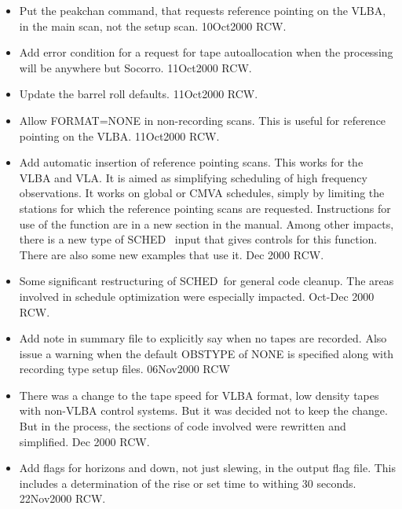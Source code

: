 \documentclass{report}
\newcommand{\schedb}{{\sc SCHED~}}
\begin{document}
\begin{itemize}
\item Put the peakchan command, that requests reference pointing on
      the VLBA, in the main scan, not the setup scan.  10Oct2000 RCW.

\item Add error condition for a request for tape autoallocation
      when the processing will be anywhere but Socorro.  11Oct2000 RCW.

\item Update the barrel roll defaults.  11Oct2000 RCW.

\item Allow FORMAT=NONE in non-recording scans.  This is useful for
      reference pointing on the VLBA.  11Oct2000 RCW.

\item Add automatic insertion of reference pointing scans.  This
      works for the VLBA and VLA.  It is aimed
      as simplifying scheduling of high frequency observations.  It
      works on global or CMVA schedules, simply by limiting the stations
      for which the reference pointing scans are requested.
      Instructions for use of the function are in a new section in
      the manual.  Among other impacts, there is a new type of \schedb
      input that gives controls for this function.  There are also
      some new examples that use it.  Dec 2000 RCW.

\item Some significant restructuring of \schedb for general code
      cleanup.  The areas involved in schedule optimization were
      especially impacted.  Oct-Dec 2000  RCW.

\item Add note in summary file to explicitly say when no tapes are
      recorded.  Also issue a warning when the default OBSTYPE of
      NONE is specified along with recording type setup files.
      06Nov2000 RCW

\item There was a change to the tape speed for VLBA format, low
      density tapes with non-VLBA control systems.  But it was
      decided not to keep the change.  But in the process, the
      sections of code involved were rewritten and simplified.
      Dec 2000 RCW.

\item Add flags for horizons and down, not just slewing, in the output
      flag file.  This includes a determination of the rise or set
      time to withing 30 seconds.  22Nov2000 RCW.


\end{itemize}
\end{document}
